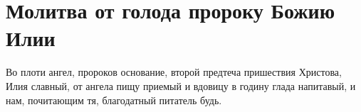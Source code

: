 \newpage

\section{Молитва от голода пророку Божию Илии}\begin{mymulticols}
 

Во плоти ангел, пророков основание, второй предтеча пришествия Христова, Илия славный, от ангела пищу приемый и вдовицу в годину глада напитавый, и нам, почитающим тя, благодатный питатель будь.

\par
{}

\end{mymulticols}

\mychapterending


 
